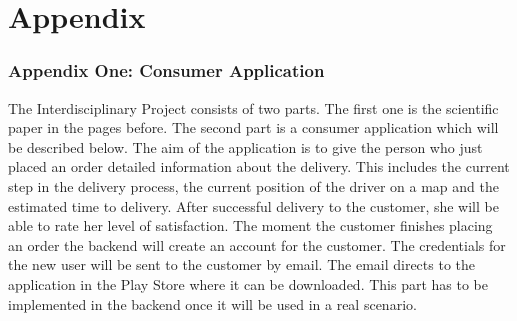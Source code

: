 \part*{Appendix}
\renewcommand{\thesection}{\roman{section}}
\renewcommand{\theequation}{\arabic{equation}}
\section*{Appendix One: Consumer Application}\label{section:Appendix One: Consumer Application}

The Interdisciplinary Project consists of two parts. The first one is the scientific paper in the pages before. The second part is a consumer application which will be described below.\newline
The aim of the application is to give the person who just placed an order detailed  information about the delivery. This includes the current step in the delivery process, the current position of the driver on a map and the estimated time to delivery. After successful delivery to the customer, she will be able to rate her level of satisfaction.\newline
The moment the customer finishes placing an order the backend will create an account for the customer. The credentials for the new user will be sent to the customer by email. The email directs to the application in the Play Store where it can be downloaded. This part has to be implemented in the backend once it will be used in a real scenario.\newline
